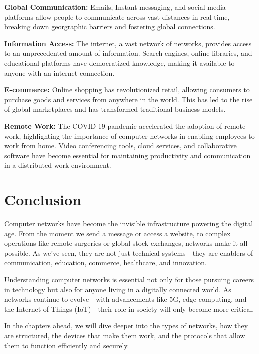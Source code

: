 \begin{description}
    \item \textbf{Global Communication:} Emails, Instant messaging, and social media platforms allow people to communicate across vast distances in real time, breaking down georgraphic barriers and fostering global connections.
    \item \textbf{Information Access:} The internet, a vast network of networks, provides access to an unprecedented amount of information. Search engines, online libraries, and educational platforms have democratized knowledge, making it available to anyone with an internet connection.
    \item \textbf{E-commerce:} Online shopping has revolutionized retail, allowing consumers to purchase goods and services from anywhere in the world. This has led to the rise of global marketplaces and has transformed traditional business models.
    \item \textbf{Remote Work:} The COVID-19 pandemic accelerated the adoption of remote work, highlighting the importance of computer networks in enabling employees to work from home. Video conferencing tools, cloud services, and collaborative software have become essential for maintaining productivity and communication in a distributed work environment.
\end{description}

\section{Conclusion}

Computer networks have become the invisible infrastructure powering the digital age. From the moment we send a message or access a website, to complex operations like remote surgeries or global stock exchanges, networks make it all possible. As we've seen, they are not just technical systems—they are enablers of communication, education, commerce, healthcare, and innovation.

Understanding computer networks is essential not only for those pursuing careers in technology but also for anyone living in a digitally connected world. As networks continue to evolve—with advancements like 5G, edge computing, and the Internet of Things (IoT)—their role in society will only become more critical.

In the chapters ahead, we will dive deeper into the types of networks, how they are structured, the devices that make them work, and the protocols that allow them to function efficiently and securely.
